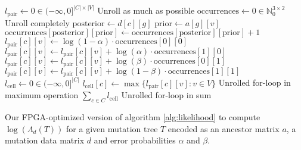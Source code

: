 \begin{algorithm}[p]
    \begin{algorithmic}
            \State $l_\mathrm{pair} \leftarrow 0 \in (-\infty,0]^{|C| \times |V|}$
             \Comment Unroll as much as possible
                \State $\mathrm{occurrences} \leftarrow 0 \in \mathbb{N}_0^{3 \times 2}$
                 \Comment Unroll completely
                    \State $\mathrm{posterior} \leftarrow d[c][g]$
                    \State $\mathrm{prior} \leftarrow a[g][v]$
                    \State $\mathrm{occurrences}[\mathrm{posterior}][\mathrm{prior}] \leftarrow \mathrm{occurrences}[\mathrm{posterior}][\mathrm{prior}] + 1$
                \EndFor
                \State $l_\mathrm{pair}[c][v] \leftarrow \log(1-\alpha) \cdot \mathrm{occurrences}[0][0]$
                \State $l_\mathrm{pair}[c][v] \leftarrow l_\mathrm{pair}[c][v] + \log(\alpha) \cdot \mathrm{occurrences}[1][0]$
                \State $l_\mathrm{pair}[c][v] \leftarrow l_\mathrm{pair}[c][v] + \log(\beta) \cdot \mathrm{occurrences}[0][1]$
                \State $l_\mathrm{pair}[c][v] \leftarrow l_\mathrm{pair}[c][v] + \log(1-\beta) \cdot \mathrm{occurrences}[1][1]$
            \EndFor
            \State $l_\mathrm{cell} \leftarrow 0 \in (-\infty,0]^{|C|}$
                \State $l_\mathrm{cell}[c] \leftarrow \max \{l_\mathrm{pair}[c][v] : v \in V\}$ \Comment Unrolled for-loop in maximum operation
            \EndFor
            \State \Return $\sum_{c \in C} l_\mathrm{cell}$ \Comment Unrolled for-loop in sum
        \EndFunction
    \end{algorithmic}
    \caption{Our \ac{FPGA}-optimized version of algorithm \ref{alg:likelihood} to compute $\log(\Lambda_d(T))$ for a given mutation tree $T$ encoded as an ancestor matrix $a$, a mutation data matrix $d$ and error probabilities $\alpha$ and $\beta$.}
    \label{alg:likelihoodimpl}
\end{algorithm}